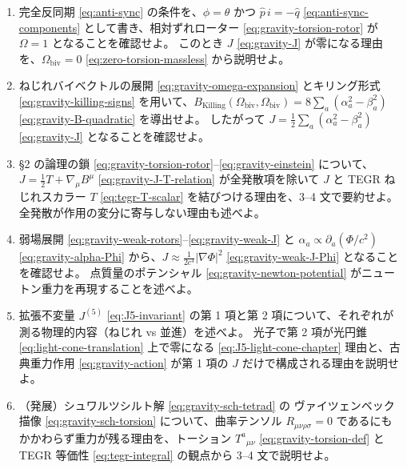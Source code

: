 \documentclass[dvipdfmx,a4paper,oneside]{jsbook}
\numberwithin{equation}{chapter}
\begin{document}
\begin{enumerate}[leftmargin=2em]
  \item 完全反同期 \eqref{eq:anti-sync} の条件を、\(\phi = \theta\) かつ \(\hat{p}\, i = -\hat{q}\) \eqref{eq:anti-sync-components} として書き、相対ずれローター \eqref{eq:gravity-torsion-rotor} が \(\Omega = 1\) となることを確認せよ。
  このとき \(J\) \eqref{eq:gravity-J} が零になる理由を、\(\Omega_{\mathrm{biv}} = 0\) \eqref{eq:zero-torsion-massless} から説明せよ。

  \item ねじれバイベクトルの展開 \eqref{eq:gravity-omega-expansion} とキリング形式 \eqref{eq:gravity-killing-signs} を用いて、\(B_{\mathrm{Killing}}(\Omega_{\mathrm{biv}}, \Omega_{\mathrm{biv}}) = 8\sum_a(\alpha_a^2 - \beta_a^2)\) \eqref{eq:gravity-B-quadratic} を導出せよ。
  したがって \(J = \tfrac{1}{2}\sum_a(\alpha_a^2 - \beta_a^2)\) \eqref{eq:gravity-J} となることを確認せよ。

  \item §2 の論理の鎖 \eqref{eq:gravity-torsion-rotor}–\eqref{eq:gravity-einstein} について、\(J = \tfrac{1}{2}T + \nabla_\mu B^\mu\) \eqref{eq:gravity-J-T-relation} が全発散項を除いて \(J\) と TEGR ねじれスカラー \(T\) \eqref{eq:tegr-T-scalar} を結びつける理由を、3--4 文で要約せよ。
  全発散が作用の変分に寄与しない理由も述べよ。

  \item 弱場展開 \eqref{eq:gravity-weak-rotors}–\eqref{eq:gravity-weak-J} と \(\alpha_a \propto \partial_a(\Phi/c^2)\) \eqref{eq:gravity-alpha-Phi} から、\(J \approx \tfrac{1}{2c^4}|\nabla\Phi|^2\) \eqref{eq:gravity-weak-J-Phi} となることを確認せよ。
  点質量のポテンシャル \eqref{eq:gravity-newton-potential} がニュートン重力を再現することを述べよ。

  \item 拡張不変量 \(J^{(5)}\) \eqref{eq:J5-invariant} の第 1 項と第 2 項について、それぞれが測る物理的内容（ねじれ vs 並進）を述べよ。
  光子で第 2 項が光円錐 \eqref{eq:light-cone-translation} 上で零になる \eqref{eq:J5-light-cone-chapter} 理由と、古典重力作用 \eqref{eq:gravity-action} が第 1 項の \(J\) だけで構成される理由を説明せよ。

  \item （発展）シュワルツシルト解 \eqref{eq:gravity-sch-tetrad} の ヴァイツェンベック描像 \eqref{eq:gravity-sch-torsion} について、曲率テンソル \(R_{\mu\nu\rho\sigma} = 0\) であるにもかかわらず重力が残る理由を、トーション \(T^a{}_{\mu\nu}\) \eqref{eq:gravity-torsion-def} と TEGR 等価性 \eqref{eq:tegr-integral} の観点から 3--4 文で説明せよ。
\end{enumerate}
\end{document}

